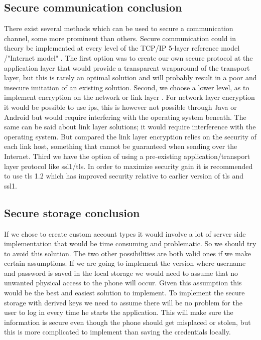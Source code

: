 \newpage

\subsection{Secure communication conclusion}
There exist several methods which can be used to secure a communication channel, some more prominent than others. Secure communication could in theory be implemented at every level of the TCP/IP 5-layer reference model \cite{bib:cn}/"Internet model" \cite{bib:rfc1122}. The first option was to create our own secure protocol at the application layer that would provide a transparent wraparound of the transport layer, but this is rarely an optimal solution and will probably result in a poor and insecure imitation of an existing solution.
\newline
\newline
Second, we choose a lower level, as to implement encryption on the network or link layer \cite{bib:techtarget}. For network layer encryption it would be possible to use \gls{ips}, this is however not possible through Java or Android \cite{bib:ispec} but would require interfering with the operating system beneath.  The same can be said about link layer solutions; it would require interference with the operating system. But compared the link layer encryption relies on the security of each link host, something that cannot be guaranteed when sending over the Internet.
\newline
\newline
Third we have the option of using a pre-existing application/transport layer protocol like \gls{ssl1}/\gls{tls}. In order to maximize security gain it is recommended to use \gls{tls} 1.2 \cite{bib:ssl}  which has improved security relative to earlier version of \gls{tls} and \gls{ssl1}.

\subsection{Secure storage conclusion}
If we chose to create custom account types it would involve a lot of server side implementation that would be time consuming and problematic. So we should try to avoid this solution. The two other possibilities are both valid ones if we make certain assumptions.
\newline
\newline
If we are going to implement the version where username and password is saved in the local storage we would need to assume that no unwanted physical access to the phone will occur. Given this assumption this would be the best and easiest solution to implement.
\newline
\newline
To implement the secure storage with derived keys we need to assume there will be no problem for the user to log in every time he starts the application. This will make sure the information is secure even though the phone should get misplaced or stolen, but this is more complicated to implement than saving the credentials locally.

